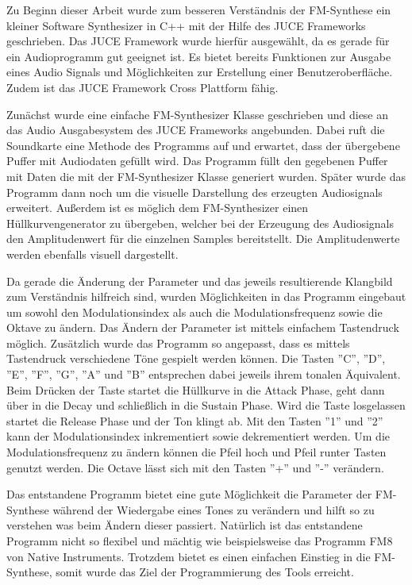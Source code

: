 Zu Beginn dieser Arbeit wurde zum besseren Verständnis der FM-Synthese ein kleiner Software Synthesizer in C++ mit der Hilfe des JUCE Frameworks geschrieben. Das JUCE Framework wurde hierfür ausgewählt, da es gerade für ein Audioprogramm gut geeignet ist. Es bietet bereits Funktionen zur Ausgabe eines Audio Signals und Möglichkeiten zur Erstellung einer Benutzeroberfläche. Zudem ist das JUCE Framework Cross Plattform fähig.

Zunächst wurde eine einfache FM-Synthesizer Klasse geschrieben und diese an das Audio Ausgabesystem des JUCE Frameworks angebunden. Dabei ruft die Soundkarte eine Methode des Programms auf und erwartet, dass der übergebene Puffer mit Audiodaten gefüllt wird. Das Programm füllt den gegebenen Puffer mit Daten die mit der FM-Synthesizer Klasse generiert wurden. Später wurde das Programm dann noch um die visuelle Darstellung des erzeugten Audiosignals erweitert. Außerdem ist es möglich dem FM-Synthesizer einen Hüllkurvengenerator zu übergeben, welcher bei der Erzeugung des Audiosignals den Amplitudenwert für die einzelnen Samples bereitstellt. Die Amplitudenwerte werden ebenfalls visuell dargestellt.

Da gerade die Änderung der Parameter und das jeweils resultierende Klangbild zum Verständnis hilfreich sind, wurden Möglichkeiten in das Programm eingebaut um sowohl den Modulationsindex als auch die Modulationsfrequenz sowie die Oktave zu ändern. Das Ändern der Parameter ist mittels einfachem Tastendruck möglich. Zusätzlich wurde das Programm so angepasst, dass es mittels Tastendruck verschiedene Töne gespielt werden können. Die Tasten ''C'', ''D'', ''E'', ''F'', ''G'', ''A'' und ''B'' entsprechen dabei jeweils ihrem tonalen Äquivalent. Beim Drücken der Taste startet die Hüllkurve in die Attack Phase, geht dann über in die Decay und schließlich in die Sustain Phase. Wird die Taste losgelassen startet die Release Phase und der Ton klingt ab. Mit den Tasten ''1'' und ''2'' kann der Modulationsindex inkrementiert sowie dekrementiert werden. Um die Modulationsfrequenz zu ändern können die Pfeil hoch und Pfeil runter Tasten genutzt werden. Die Octave lässt sich mit den Tasten ''+'' und ''-'' verändern.

Das entstandene Programm bietet eine gute Möglichkeit die Parameter der FM-Synthese während der Wiedergabe eines Tones zu verändern und hilft so zu verstehen was beim Ändern dieser passiert. Natürlich ist das entstandene Programm nicht so flexibel und mächtig wie beispielsweise das Programm FM8 von Native Instruments. Trotzdem bietet es einen einfachen Einstieg in die FM-Synthese, somit wurde das Ziel der Programmierung des Tools erreicht.
\FloatBarrier
